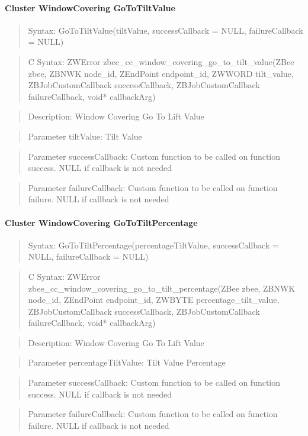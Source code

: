 \paragraph{Cluster WindowCovering GoToTiltValue}
\begin{quote}Syntax: GoToTiltValue(tiltValue, successCallback = NULL, failureCallback = NULL)\end{quote}
\begin{quote}C Syntax: ZWError zbee\_cc\_window\_covering\_go\_to\_tilt\_value(ZBee zbee, ZBNWK node\_id, ZEndPoint endpoint\_id, ZWWORD tilt\_value, ZBJobCustomCallback successCallback, ZBJobCustomCallback failureCallback, void* callbackArg)\end{quote}
\begin{quote}Description: Window Covering Go To Lift Value\end{quote}
\begin{quote}Parameter tiltValue: Tilt Value\end{quote}
\begin{quote}Parameter successCallback: Custom function to be called on function success. NULL if callback is not needed\end{quote}
\begin{quote}Parameter failureCallback: Custom function to be called on function failure. NULL if callback is not needed\end{quote}


\paragraph{Cluster WindowCovering GoToTiltPercentage}
\begin{quote}Syntax: GoToTiltPercentage(percentageTiltValue, successCallback = NULL, failureCallback = NULL)\end{quote}
\begin{quote}C Syntax: ZWError zbee\_cc\_window\_covering\_go\_to\_tilt\_percentage(ZBee zbee, ZBNWK node\_id, ZEndPoint endpoint\_id, ZWBYTE percentage\_tilt\_value, ZBJobCustomCallback successCallback, ZBJobCustomCallback failureCallback, void* callbackArg)\end{quote}
\begin{quote}Description: Window Covering Go To Lift Value\end{quote}
\begin{quote}Parameter percentageTiltValue: Tilt Value Percentage\end{quote}
\begin{quote}Parameter successCallback: Custom function to be called on function success. NULL if callback is not needed\end{quote}
\begin{quote}Parameter failureCallback: Custom function to be called on function failure. NULL if callback is not needed\end{quote}


